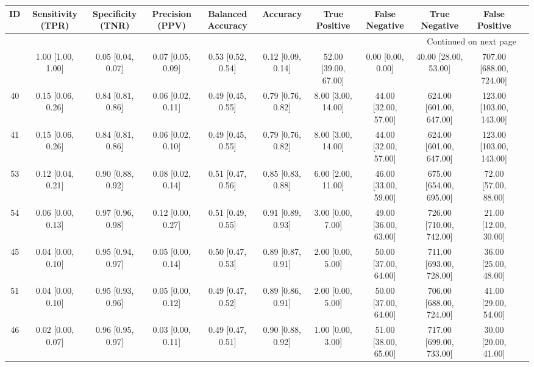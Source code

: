 \documentclass[8pt]{article}
\begin{document}
\begin{center}
\begin{footnotesize}
\begin{longtable}{|ccccccccccc|}
\toprule
 ID &  Sensitivity (TPR) &  Specificity (TNR) &    Precision (PPV) &  Balanced Accuracy &           Accuracy &         True Positive &        False Negative &            True Negative &           False Positive \\
\midrule
\endhead
\midrule
\multicolumn{10}{r}{{Continued on next page}} \\
\midrule
\endfoot

\bottomrule
\endlastfoot
 42 &  1.00 [1.00, 1.00] &  0.05 [0.04, 0.07] &  0.07 [0.05, 0.09] &  0.53 [0.52, 0.54] &  0.12 [0.09, 0.14] &  52.00 [39.00, 67.00] &     0.00 [0.00, 0.00] &     40.00 [28.00, 53.00] &  707.00 [688.00, 724.00] \\
 40 &  0.15 [0.06, 0.26] &  0.84 [0.81, 0.86] &  0.06 [0.02, 0.11] &  0.49 [0.45, 0.55] &  0.79 [0.76, 0.82] &    8.00 [3.00, 14.00] &  44.00 [32.00, 57.00] &  624.00 [601.00, 647.00] &  123.00 [103.00, 143.00] \\
 41 &  0.15 [0.06, 0.26] &  0.84 [0.81, 0.86] &  0.06 [0.02, 0.10] &  0.49 [0.45, 0.55] &  0.79 [0.76, 0.82] &    8.00 [3.00, 14.00] &  44.00 [32.00, 57.00] &  624.00 [601.00, 647.00] &  123.00 [103.00, 143.00] \\
 53 &  0.12 [0.04, 0.21] &  0.90 [0.88, 0.92] &  0.08 [0.02, 0.14] &  0.51 [0.47, 0.56] &  0.85 [0.83, 0.88] &    6.00 [2.00, 11.00] &  46.00 [33.00, 59.00] &  675.00 [654.00, 695.00] &     72.00 [57.00, 88.00] \\
 54 &  0.06 [0.00, 0.13] &  0.97 [0.96, 0.98] &  0.12 [0.00, 0.27] &  0.51 [0.49, 0.55] &  0.91 [0.89, 0.93] &     3.00 [0.00, 7.00] &  49.00 [36.00, 63.00] &  726.00 [710.00, 742.00] &     21.00 [12.00, 30.00] \\
 45 &  0.04 [0.00, 0.10] &  0.95 [0.94, 0.97] &  0.05 [0.00, 0.14] &  0.50 [0.47, 0.53] &  0.89 [0.87, 0.91] &     2.00 [0.00, 5.00] &  50.00 [37.00, 64.00] &  711.00 [693.00, 728.00] &     36.00 [25.00, 48.00] \\
 51 &  0.04 [0.00, 0.10] &  0.95 [0.93, 0.96] &  0.05 [0.00, 0.12] &  0.49 [0.47, 0.52] &  0.89 [0.86, 0.91] &     2.00 [0.00, 5.00] &  50.00 [37.00, 64.00] &  706.00 [688.00, 724.00] &     41.00 [29.00, 54.00] \\
 46 &  0.02 [0.00, 0.07] &  0.96 [0.95, 0.97] &  0.03 [0.00, 0.11] &  0.49 [0.47, 0.51] &  0.90 [0.88, 0.92] &     1.00 [0.00, 3.00] &  51.00 [38.00, 65.00] &  717.00 [699.00, 733.00] &     30.00 [20.00, 41.00] \\

\end{longtable}
\end{footnotesize}
\end{center}
\end{document}
